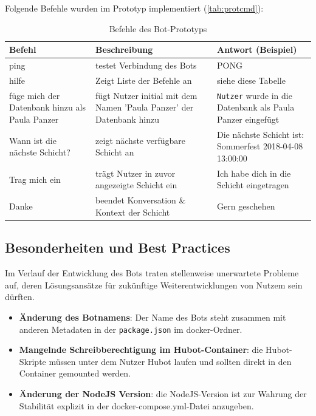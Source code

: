 Folgende Befehle wurden im Prototyp implementiert (\autoref{tab:protcmd}):

\begin{table}[h!]
    \centering
    \begin{tabularx}{\textwidth}{|X|X|X|}
        \hline
        \textbf{Befehl} & \textbf{Beschreibung} & \textbf{Antwort} (Beispiel) \\
        \hline
        ping & testet Verbindung des Bots & PONG \\
        \hline
        hilfe & Zeigt Liste der Befehle an & siehe diese Tabelle \\
        \hline
        füge mich der Datenbank hinzu als Paula Panzer & fügt Nutzer initial mit dem Namen 'Paula Panzer' der Datenbank hinzu & \texttt{Nutzer} wurde in die Datenbank als Paula Panzer eingefügt \\
        \hline
        Wann ist die nächste Schicht? & zeigt nächste verfügbare Schicht an & Die nächste Schicht ist: Sommerfest 2018-04-08 13:00:00 \\
        \hline
        Trag mich ein & trägt Nutzer in zuvor angezeigte Schicht ein & Ich habe dich in die Schicht eingetragen \\
        \hline
        Danke & beendet Konversation \& Kontext der Schicht & Gern geschehen \\
        \hline
    \end{tabularx}
    \caption{Befehle des Bot-Prototyps}
    \label{tab:protcmd}
\end{table}


\subsection{Besonderheiten und Best Practices}

Im Verlauf der Entwicklung des Bots traten stellenweise unerwartete Probleme auf, deren Lösungsansätze für zukünftige Weiterentwicklungen von Nutzem sein dürften.
\begin{itemize}
    \item \textbf{Änderung des Botnamens}: Der Name des Bots steht zusammen mit anderen Metadaten in der \texttt{package.json} im docker-Ordner.
    \item \textbf{Mangelnde Schreibberechtigung im Hubot-Container}: die Hubot-Skripte müssen unter dem Nutzer Hubot laufen und sollten direkt in den Container gemounted werden.
    \item \textbf{Änderung der NodeJS Version}: die NodeJS-Version ist zur Wahrung der Stabilität explizit in der docker-compose.yml-Datei anzugeben.

\end{itemize}
